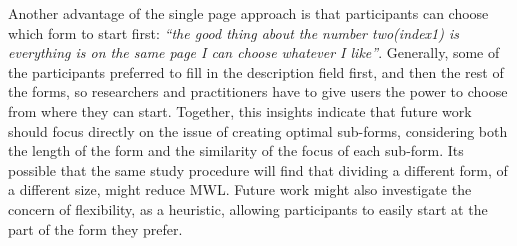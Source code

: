 \documentclass[../main/Replicate.tex]{subfiles}
\begin{document}

	Another advantage of the single page approach is that participants can choose which form to start first: \textit{``the good thing about the number two(index1) is everything is on the same page I can choose whatever I like''}. 
	Generally, some of the participants preferred to fill in the description field first, and then the rest of the forms, so researchers and practitioners have to give users the power to choose from where they can start. Together, this insights indicate that future work should focus directly on the issue of creating optimal sub-forms, considering both the length of the form and the similarity of the focus of each sub-form. Its possible that the same study procedure will find that dividing a different form, of a different size, might reduce MWL. Future work might also investigate the concern of flexibility, as a heuristic, allowing participants to easily start at the part of the form they prefer.

	
\end{document}
